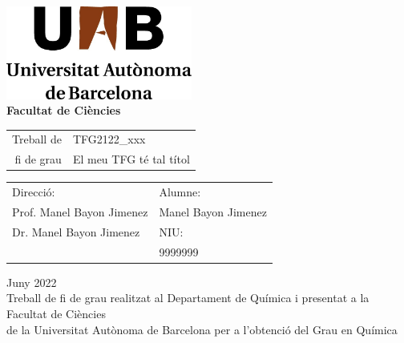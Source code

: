 \documentclass[11pt]{article}
\newcommand\NomComplet{Manel Bayon Jimenez}
\newcommand\NIU{9999999}
\newcommand\NomProfeA{Prof. Manel Bayon Jimenez}
\newcommand\NomProfeB{Dr. Manel Bayon Jimenez}
\newcommand\CodiTFG{TFG2122\_xxx}
\newcommand\TitolTFG{El meu TFG té tal títol}
\newcommand\NomCentre{Departament de Química } %
\newcommand\NomGrau{Química }
\newcommand\Mes{Juny } %
\newcommand\Any{2022}
\begin{document}
\begin{titlepage}

\center %


\includegraphics[width = 6.1cm]{nom_uab.jpg}\\[1.76cm] %


\textbf{\LARGE Facultat de Ciències}\\[3.53cm] %
\begin{flushright}
\begin{tabular}{r | p{}}
  {\Large Treball de} & {\LARGE \CodiTFG}\\
  {\LARGE fi de grau}  & {\LARGE \TitolTFG}
\end{tabular}
\end{flushright}\vspace{7.06cm}




\begin{tabular}{p{} p{}}
\large
Direcció: & Alumne: \\
\NomProfeA & \NomComplet\\
\NomProfeB & NIU: \\
 & \NIU
\end{tabular}
\vspace{0.7cm}



{\large \Mes \Any}\\[1.4cm] %

Treball de fi de grau realitzat al \NomCentre i presentat a la\\ Facultat de Ciències\\ de la Universitat Autònoma de Barcelona per a l'obtenció del Grau en \NomGrau


\end{titlepage}
\end{document}
